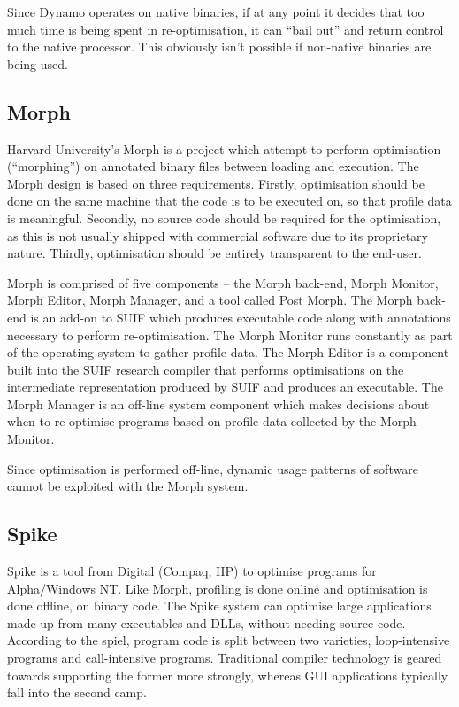 Since Dynamo operates on native binaries, if at any point it decides
that too much time is being spent in re-optimisation, it can ``bail
out'' and return control to the native processor. This obviously isn't
possible if non-native binaries are being used.


\subsection{Morph}

Harvard University's Morph is a project which attempt to perform optimisation
({}``morphing'') on annotated binary files between loading and execution.
The Morph design is based on three requirements. Firstly, optimisation
should be done on the same machine that the code is to be executed
on, so that profile data is meaningful. Secondly, no source code should
be required for the optimisation, as this is not usually shipped with
commercial software due to its proprietary nature. Thirdly, optimisation
should be entirely transparent to the end-user.

Morph is comprised of five components -- the Morph back-end, Morph
Monitor, Morph Editor, Morph Manager, and a tool called Post Morph.
The Morph back-end is an add-on to SUIF which produces executable
code along with annotations necessary to perform re-optimisation.
The Morph Monitor runs constantly as part of the operating system
to gather profile data. The Morph Editor is a component built into
the SUIF research compiler that performs optimisations on the intermediate
representation produced by SUIF and produces an executable. The Morph
Manager is an off-line system component which makes decisions about
when to re-optimise programs based on profile data collected by the
Morph Monitor.

Since optimisation is performed off-line, dynamic usage patterns of
software cannot be exploited with the Morph system.


\subsection{Spike}

Spike \cite{2} is a tool from Digital (Compaq, HP) to optimise programs
for Alpha/Windows NT\@. Like Morph, profiling is done online and optimisation
is done offline, on binary code. The Spike system can optimise large
applications made up from many executables and DLLs, without needing
source code. According to the spiel, program code is split between
two varieties, loop-intensive programs and call-intensive programs.
Traditional compiler technology is geared towards supporting the former
more strongly, whereas GUI applications typically fall into the second
camp.

